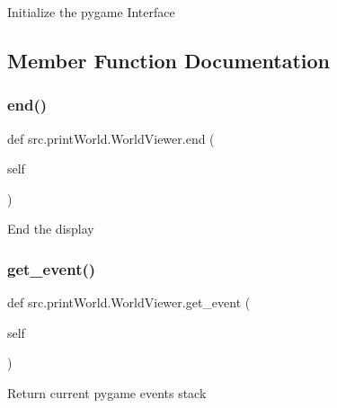 \begin{DoxyVerb}Initialize the pygame Interface \end{DoxyVerb}
 

\subsection{Member Function Documentation}
\hypertarget{classsrc_1_1print_world_1_1_world_viewer_a14ac500624dec54f806b82a9c193cd29}{}\label{classsrc_1_1print_world_1_1_world_viewer_a14ac500624dec54f806b82a9c193cd29} 
\subsubsection{\texorpdfstring{end()}{end()}}
{\footnotesize\ttfamily def src.\+print\+World.\+World\+Viewer.\+end (\begin{DoxyParamCaption}\item[{}]{self }\end{DoxyParamCaption})}

\begin{DoxyVerb}End the display \end{DoxyVerb}
 \hypertarget{classsrc_1_1print_world_1_1_world_viewer_a9fe50be5fc7237f38e87c0917091116f}{}\label{classsrc_1_1print_world_1_1_world_viewer_a9fe50be5fc7237f38e87c0917091116f} 
\subsubsection{\texorpdfstring{get\+\_\+event()}{get\_event()}}
{\footnotesize\ttfamily def src.\+print\+World.\+World\+Viewer.\+get\+\_\+event (\begin{DoxyParamCaption}\item[{}]{self }\end{DoxyParamCaption})}

\begin{DoxyVerb}Return current pygame events stack \end{DoxyVerb}
 \hypertarget{classsrc_1_1print_world_1_1_world_viewer_a8fd85551d968fa3bdab94f6b8e233bd3}{}\label{classsrc_1_1print_world_1_1_world_viewer_a8fd85551d968fa3bdab94f6b8e233bd3} 
